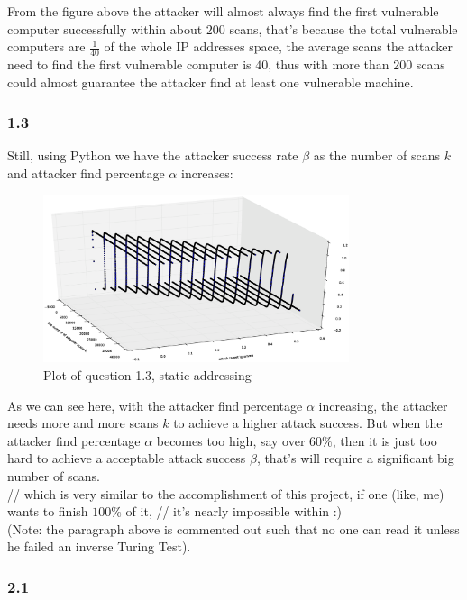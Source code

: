 \documentclass[10pt]{article}
\begin{document}
From the figure above the attacker will almost always find the first vulnerable computer successfully within about $200$ scans, that's because the total vulnerable computers are $\frac{1}{40}$ of the whole IP addresses space, the average scans the attacker need to find the first vulnerable computer is $40$, thus with more than $200$ scans could almost guarantee the attacker find at least one vulnerable machine.

\subsubsection*{1.3}

Still, using Python we have the attacker success rate $\beta$ as the number of scans $k$ and attacker find percentage $\alpha$ increases:

\begin{figure}[H]
\begin{center}
\includegraphics[width=0.8\textwidth]{figure1.3.eps}
\caption{Plot of question 1.3, static addressing}
\end{center}
\end{figure}

As we can see here, with the attacker find percentage $\alpha$ increasing, the attacker needs more and more scans $k$ to achieve a higher attack success. But when the attacker find percentage $\alpha$ becomes too high, say over $60\%$, then it is just too hard to achieve a acceptable attack success $\beta$, that's will require a significant big number of scans. \\
// which is very similar to the accomplishment of this project, if one (like, me) wants to finish $100\%$ of it, // it's nearly impossible within :) \\
(Note: the paragraph above is commented out such that no one can read it unless he failed an inverse Turing Test).


\subsubsection*{2.1}
\end{document}
